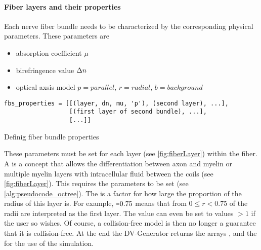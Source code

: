 \paragraph{Fiber layers and their properties}
Each nerve fiber bundle needs to be characterized by the corresponding physical parameters.
These parameters are 
\begin{itemize}[nosep]
    \item absorption coefficient $\mu$
    \item birefringence value $\Delta n$
    \item optical axsis model $p=\mathit{parallel}$, $r=\mathit{radial}$, $b=\mathit{background}$
\end{itemize}
%
\begin{lstfloat}[!tb]
\lstset{style=python}
\begin{lstlisting}[]
fbs_properties = [[(layer, dn, mu, 'p'), (second layer), ...],
                  [(first layer of second bundle), ...],
                  [...]]
\end{lstlisting}
\caption{Definig fiber bundle properties}
\label{alg:fiberbundleprops}
\end{lstfloat}
% 
These parameters must be set for each layer (see \cref{fig:fiberLayer}) within the fiber.
A  is a concept that allows the differentiation between axon and myelin or multiple myelin layers with intracellular fluid between the coils (see \cref{fig:fiberLayer}).
This requires the parameters to be set (see \cref{alg:pseudocode_octree}).
% 
The  is a factor for how large the proportion of the radius of this layer is.
For example, $\texttt{=}0.75$ means that from $0\leq r < 0.75$ of the radii are interpreted as the first layer.
The value can even be set to values $>1$ if the user so wishes.
Of course, a collision-free model is then no longer a guarantee that it is collision-free.
% 
At the end the DV-Generator returns the arrays \tissue{}, \opticalaxis{} and the \propertylist{} for the use of the simulation.
% 
